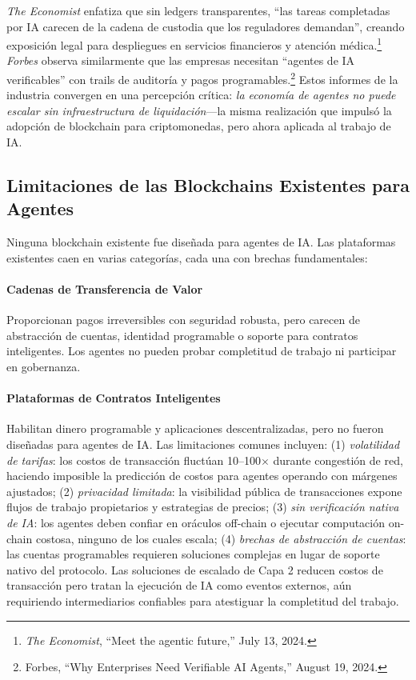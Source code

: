 \documentclass[11pt]{article}
\begin{document}
\emph{The Economist} enfatiza que sin ledgers transparentes, ``las tareas completadas por IA carecen de la cadena de custodia que los reguladores demandan'', creando exposición legal para despliegues en servicios financieros y atención médica.\footnote{\emph{The Economist}, ``Meet the agentic future,'' July 13, 2024.} \emph{Forbes} observa similarmente que las empresas necesitan ``agentes de IA verificables'' con trails de auditoría y pagos programables.\footnote{Forbes, ``Why Enterprises Need Verifiable AI Agents,'' August 19, 2024.} Estos informes de la industria convergen en una percepción crítica: \emph{la economía de agentes no puede escalar sin infraestructura de liquidación}---la misma realización que impulsó la adopción de blockchain para criptomonedas, pero ahora aplicada al trabajo de IA.

\subsection{Limitaciones de las Blockchains Existentes para Agentes}
Ninguna blockchain existente fue diseñada para agentes de IA. Las plataformas existentes caen en varias categorías, cada una con brechas fundamentales:

\paragraph{Cadenas de Transferencia de Valor} Proporcionan pagos irreversibles con seguridad robusta, pero carecen de abstracción de cuentas, identidad programable o soporte para contratos inteligentes. Los agentes no pueden probar completitud de trabajo ni participar en gobernanza.

\paragraph{Plataformas de Contratos Inteligentes} Habilitan dinero programable y aplicaciones descentralizadas, pero no fueron diseñadas para agentes de IA. Las limitaciones comunes incluyen: (1) \emph{volatilidad de tarifas}: los costos de transacción fluctúan 10--100$\times$ durante congestión de red, haciendo imposible la predicción de costos para agentes operando con márgenes ajustados; (2) \emph{privacidad limitada}: la visibilidad pública de transacciones expone flujos de trabajo propietarios y estrategias de precios; (3) \emph{sin verificación nativa de IA}: los agentes deben confiar en oráculos off-chain o ejecutar computación on-chain costosa, ninguno de los cuales escala; (4) \emph{brechas de abstracción de cuentas}: las cuentas programables requieren soluciones complejas en lugar de soporte nativo del protocolo. Las soluciones de escalado de Capa 2 reducen costos de transacción pero tratan la ejecución de IA como eventos externos, aún requiriendo intermediarios confiables para atestiguar la completitud del trabajo.
\end{document}
